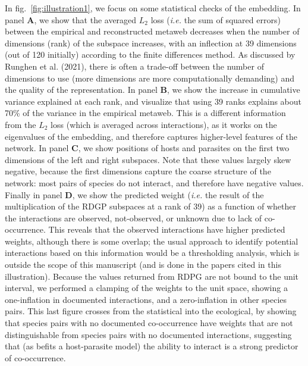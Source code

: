 \documentclass[11pt]{article}
\begin{document}
In fig.~\ref{fig:illustration1}, we focus on some statistical checks of
the embedding. In panel \textbf{A}, we show that the averaged \(L_2\)
loss (\emph{i.e.} the sum of squared errors) between the empirical and
reconstructed metaweb decreases when the number of dimensions (rank) of
the subspace increases, with an inflection at 39 dimensions (out of 120
initially) according to the finite differences method. As discussed by
Runghen et al. (2021), there is often a trade-off between the number of
dimensions to use (more dimensions are more computationally demanding)
and the quality of the representation. In panel \textbf{B}, we show the
increase in cumulative variance explained at each rank, and visualize
that using 39 ranks explains about 70\% of the variance in the empirical
metaweb. This is a different information from the \(L_2\) loss (which is
averaged across interactions), as it works on the eigenvalues of the
embedding, and therefore captures higher-level features of the network.
In panel \textbf{C}, we show positions of hosts and parasites on the
first two dimensions of the left and right subspaces. Note that these
values largely skew negative, because the first dimensions capture the
coarse structure of the network: most pairs of species do not interact,
and therefore have negative values. Finally in panel \textbf{D}, we show
the predicted weight (\emph{i.e.} the result of the multiplication of
the RDGP subspaces at a rank of 39) as a function of whether the
interactions are observed, not-observed, or unknown due to lack of
co-occurrence. This reveals that the observed interactions have higher
predicted weights, although there is some overlap; the usual approach to
identify potential interactions based on this information would be a
thresholding analysis, which is outside the scope of this manuscript
(and is done in the papers cited in this illustration). Because the
values returned from RDPG are not bound to the unit interval, we
performed a clamping of the weights to the unit space, showing a
one-inflation in documented interactions, and a zero-inflation in other
species pairs. This last figure crosses from the statistical into the
ecological, by showing that species pairs with no documented
co-occurrence have weights that are not distinguishable from species
pairs with no documented interactions, suggesting that (as befits a
host-parasite model) the ability to interact is a strong predictor of
co-occurrence.
\end{document}
